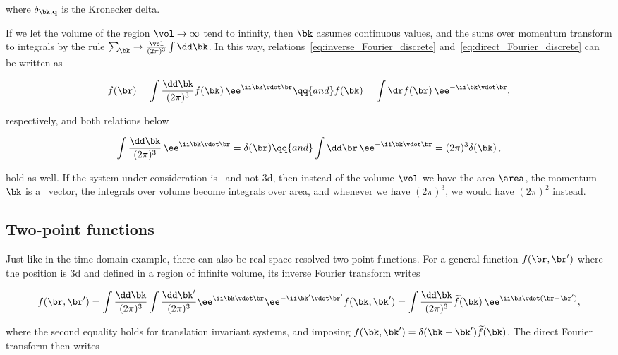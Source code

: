 \noindent where $\delta_{\bk,\mathbf{q}}$ is the Kronecker delta.

If we let the volume of the region $\vol \to \infty$ tend to infinity, then $\bk$ assumes continuous values, and the sums over momentum transform to integrals by the rule $\sum_{\bk}\to\frac{\vol}{(2\pi)^{3}}\int\dd \bk$.
In this way, relations~\eqref{eq:inverse_Fourier_discrete} and~\eqref{eq:direct_Fourier_discrete} can be written as

\begin{equation}
    f(\br)=\int\frac{\dd \bk}{(2\pi)^{3}}f(\bk)\,\ee^{\ii \bk \vdot \br} \qq{and} f(\bk)=\int \dr f(\br)\,\ee^{-\ii \bk \vdot \br},
\end{equation}

\noindent respectively, and both relations below

\begin{equation}
    \int\frac{\dd \bk}{(2\pi)^{3}}\,\ee^{\ii \bk \vdot \br}=\delta(\br) \qq{and} \int \dd \br\, \ee^{-\ii \bk \vdot \br} = (2\pi)^{3}\delta(\bk)\,,
\end{equation}
 
\noindent hold as well.
If the system under consideration is \bd~and not \gls{3d}, then instead of the volume $\vol$ we have the area $\area$, the momentum $\bk$ is a \bd~vector, the integrals over volume become integrals over area, and whenever we have $(2\pi)^{3}$, we would have $(2\pi)^{2}$ instead.

\subsection{Two-point functions}

Just like in the time domain example, there can also be real space resolved two-point functions.
For a general function $f(\br,\br')$ where the position is \gls{3d} and defined in a region of infinite volume, its inverse Fourier transform writes

\begin{equation}
    \label{eq:inverse_Fourier_two_point}
    f(\br,\br')=\int\frac{\dd \bk}{(2\pi)^{3}}\int\frac{\dd \bk'}{(2\pi)^{3}}\ee^{\ii \bk \vdot \br}\ee^{-\ii \bk' \vdot \br'}f(\bk,\bk')=\int\frac{\dd \bk}{(2\pi)^{3}}\widetilde{f}(\bk)\,\ee^{\ii \bk \vdot (\br-\br')},
\end{equation}

\noindent where the second equality holds for translation invariant systems, and imposing $f(\bk,\bk')=\delta(\bk-\bk')\widetilde{f}(\bk)$.
The direct Fourier transform then writes

